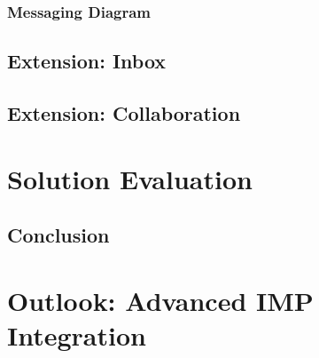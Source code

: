 \documentclass[
     12pt,         %
     a4paper,      %
     BCOR=10mm,version=first,     %
     DIV=14,version=first,        %
     ]{scrreprt}
\begin{document}
\subsection{Messaging Diagram}

\section{Extension: Inbox}

\section{Extension: Collaboration}

\chapter{Solution Evaluation}

\section{Conclusion}

\chapter{Outlook: Advanced IMP Integration}

\printbibliography
\end{document}
